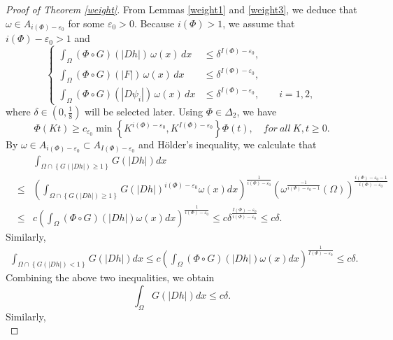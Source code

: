 \documentclass[10pt,a4paper]{article}
\theoremstyle{definition}
\numberwithin{equation}{section}
\newcommand{\ls}{\leqslant}
\newcommand{\rs}{\geqslant}
\newcommand{\holder}{H{\"o}lder}
\begin{document}
\begin{proof}[Proof of Theorem \ref{weight}]
 From Lemmas \ref{weight1} and \ref{weight3}, we deduce that $\omega\in
A_{i(\Phi)-\varepsilon_0}$ for some $\varepsilon_0>0$. Because $i(\Phi)>1$,
we assume that $i(\Phi)-\varepsilon_0>1$ and
\begin{equation}\label{js}
	\left\{
	\begin{aligned}
		\int_{\Omega}
		(\Phi\circ G)(|Dh|)\,\omega(x)\,dx
		&\leq \delta^{I(\Phi)-\varepsilon_0},
		\\[0.15cm]
		\int_{\Omega}
		(\Phi\circ G)(|F|)\,\omega(x)\,dx
		&\leq \delta^{I(\Phi)-\varepsilon_0},
		\\[0.15cm]
		\int_{\Omega}
		(\Phi\circ G)(|D\psi_i|)\,\omega(x)\,dx
		&\leq \delta^{I(\Phi)-\varepsilon_0},
		\qquad i=1,2,
	\end{aligned}
	\right.
\end{equation}
where $\delta \in(0,\frac{1}{8})$ will be selected later. Using $\Phi \in \Delta_2$, we have
$$\Phi(Kt)\rs c_{\varepsilon_0} \min\left\lbrace K^{i(\Phi)-\varepsilon_0}, K^{I(\Phi)-\varepsilon_0}\right\rbrace\Phi(t), \quad for\ all \  K,t\geqslant0. $$
By $\omega \in A_{i(\Phi)-\varepsilon_0} \subset A_{I(\Phi)-\varepsilon_0}$ and   \holder's    inequality, we calculate that
\begin{eqnarray*}
&&\int_{\Omega \cap \left\lbrace G(|Dh|)\geqslant1\right\rbrace }G(|Dh|)dx \\
&\ls& \left( \int_{\Omega \cap \left\lbrace G(|Dh|)\geqslant1\right\rbrace }G(|Dh|)^{i(\Phi)-\varepsilon_0}\omega(x)  dx \right)^{\frac{1}{i(\Phi)-\varepsilon_0}} \left( \omega^{\frac{-1}{i(\Phi)-\varepsilon_0-1}}(\Omega) \right) ^{\frac{i(\Phi)-\varepsilon_0-1}{i(\Phi)-\varepsilon_0}} \\
&\ls& c \left(\int_{\Omega} (\Phi\circ G)(|Dh|)\omega(x)dx\right) ^{\frac{1}{i(\Phi)-\varepsilon_0}}  \ls c\delta^{\frac{I(\Phi)-\varepsilon_0}{i(\Phi)-\varepsilon_0}} \ls  c\delta.
\end{eqnarray*}
Similarly,
\begin{eqnarray*}
\int_{\Omega \cap \left\lbrace G(|Dh|)<1\right\rbrace }G(|Dh|)dx \ls c \left(\int_{\Omega} (\Phi\circ G)(|Dh|)\omega(x)dx\right) ^{\frac{1}{I(\Phi)-\varepsilon_0}} \ls c\delta.
\end{eqnarray*}
Combining  the above two inequalities, we obtain
\begin{equation*}
\int_{\Omega }G(|Dh|)dx \ls c \delta.
\end{equation*}
Similarly,
\begin{equation*}

\end{equation*}
\end{proof}
\end{document}
